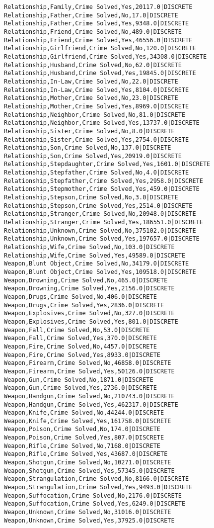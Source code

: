 \begin{lstlisting}
Relationship,Family,Crime Solved,Yes,20117.0|DISCRETE	
Relationship,Father,Crime Solved,No,17.0|DISCRETE	
Relationship,Father,Crime Solved,Yes,9348.0|DISCRETE	
Relationship,Friend,Crime Solved,No,489.0|DISCRETE	
Relationship,Friend,Crime Solved,Yes,46556.0|DISCRETE	
Relationship,Girlfriend,Crime Solved,No,120.0|DISCRETE	
Relationship,Girlfriend,Crime Solved,Yes,34308.0|DISCRETE	
Relationship,Husband,Crime Solved,No,62.0|DISCRETE	
Relationship,Husband,Crime Solved,Yes,19845.0|DISCRETE	
Relationship,In-Law,Crime Solved,No,22.0|DISCRETE	
Relationship,In-Law,Crime Solved,Yes,8104.0|DISCRETE	
Relationship,Mother,Crime Solved,No,23.0|DISCRETE	
Relationship,Mother,Crime Solved,Yes,8969.0|DISCRETE	
Relationship,Neighbor,Crime Solved,No,81.0|DISCRETE	
Relationship,Neighbor,Crime Solved,Yes,13737.0|DISCRETE	
Relationship,Sister,Crime Solved,No,8.0|DISCRETE	
Relationship,Sister,Crime Solved,Yes,2754.0|DISCRETE	
Relationship,Son,Crime Solved,No,137.0|DISCRETE	
Relationship,Son,Crime Solved,Yes,20919.0|DISCRETE	
Relationship,Stepdaughter,Crime Solved,Yes,1601.0|DISCRETE	
Relationship,Stepfather,Crime Solved,No,4.0|DISCRETE	
Relationship,Stepfather,Crime Solved,Yes,2958.0|DISCRETE	
Relationship,Stepmother,Crime Solved,Yes,459.0|DISCRETE	
Relationship,Stepson,Crime Solved,No,3.0|DISCRETE	
Relationship,Stepson,Crime Solved,Yes,2514.0|DISCRETE	
Relationship,Stranger,Crime Solved,No,20948.0|DISCRETE	
Relationship,Stranger,Crime Solved,Yes,186551.0|DISCRETE	
Relationship,Unknown,Crime Solved,No,375102.0|DISCRETE	
Relationship,Unknown,Crime Solved,Yes,197657.0|DISCRETE	
Relationship,Wife,Crime Solved,No,103.0|DISCRETE	
Relationship,Wife,Crime Solved,Yes,49589.0|DISCRETE	
Weapon,Blunt Object,Crime Solved,No,34179.0|DISCRETE	
Weapon,Blunt Object,Crime Solved,Yes,109518.0|DISCRETE	
Weapon,Drowning,Crime Solved,No,465.0|DISCRETE	
Weapon,Drowning,Crime Solved,Yes,2156.0|DISCRETE	
Weapon,Drugs,Crime Solved,No,406.0|DISCRETE	
Weapon,Drugs,Crime Solved,Yes,2836.0|DISCRETE	
Weapon,Explosives,Crime Solved,No,327.0|DISCRETE	
Weapon,Explosives,Crime Solved,Yes,801.0|DISCRETE	
Weapon,Fall,Crime Solved,No,53.0|DISCRETE	
Weapon,Fall,Crime Solved,Yes,370.0|DISCRETE	
Weapon,Fire,Crime Solved,No,4457.0|DISCRETE	
Weapon,Fire,Crime Solved,Yes,8933.0|DISCRETE	
Weapon,Firearm,Crime Solved,No,46858.0|DISCRETE	
Weapon,Firearm,Crime Solved,Yes,50126.0|DISCRETE	
Weapon,Gun,Crime Solved,No,1871.0|DISCRETE	
Weapon,Gun,Crime Solved,Yes,2736.0|DISCRETE	
Weapon,Handgun,Crime Solved,No,210743.0|DISCRETE	
Weapon,Handgun,Crime Solved,Yes,462317.0|DISCRETE	
Weapon,Knife,Crime Solved,No,44244.0|DISCRETE	
Weapon,Knife,Crime Solved,Yes,161758.0|DISCRETE	
Weapon,Poison,Crime Solved,No,174.0|DISCRETE	
Weapon,Poison,Crime Solved,Yes,807.0|DISCRETE	
Weapon,Rifle,Crime Solved,No,7168.0|DISCRETE	
Weapon,Rifle,Crime Solved,Yes,43687.0|DISCRETE	
Weapon,Shotgun,Crime Solved,No,10271.0|DISCRETE	
Weapon,Shotgun,Crime Solved,Yes,57345.0|DISCRETE	
Weapon,Strangulation,Crime Solved,No,8166.0|DISCRETE	
Weapon,Strangulation,Crime Solved,Yes,9493.0|DISCRETE	
Weapon,Suffocation,Crime Solved,No,2176.0|DISCRETE	
Weapon,Suffocation,Crime Solved,Yes,6249.0|DISCRETE	
Weapon,Unknown,Crime Solved,No,31016.0|DISCRETE	
Weapon,Unknown,Crime Solved,Yes,37925.0|DISCRETE
\end{lstlisting}


